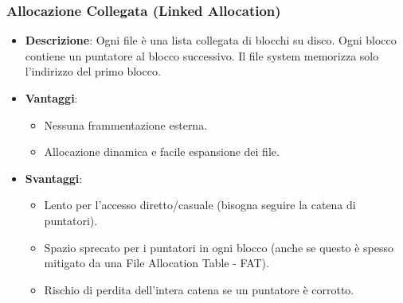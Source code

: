 \subsubsection{Allocazione Collegata (Linked Allocation)}
\begin{itemize}
    \item \textbf{Descrizione}: Ogni file è una lista collegata di blocchi su disco. Ogni blocco contiene un puntatore al blocco successivo. Il file system memorizza solo l'indirizzo del primo blocco.
    \item \textbf{Vantaggi}:
    \begin{itemize}
        \item Nessuna frammentazione esterna.
        \item Allocazione dinamica e facile espansione dei file.
    \end{itemize}
    \item \textbf{Svantaggi}:
    \begin{itemize}
        \item Lento per l'accesso diretto/casuale (bisogna seguire la catena di puntatori).
        \item Spazio sprecato per i puntatori in ogni blocco (anche se questo è spesso mitigato da una File Allocation Table - FAT).
        \item Rischio di perdita dell'intera catena se un puntatore è corrotto.
    \end{itemize}
\end{itemize}

